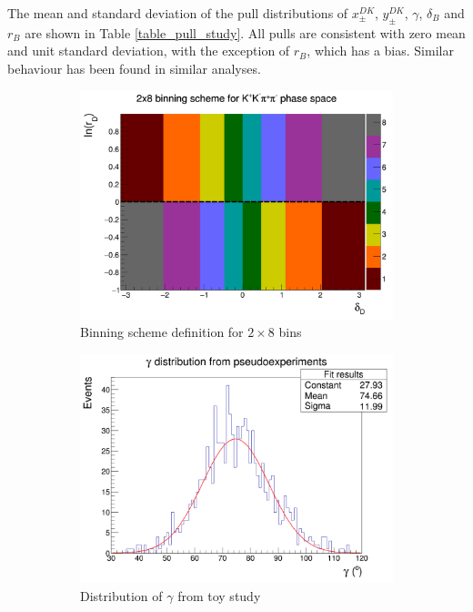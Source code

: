 \documentclass[12pt, a4paper, notitlepage, onecolumn]{article}
\numberwithin{equation}{section}
\begin{document}
The mean and standard deviation of the pull distributions of $x_\pm^{DK}$, $y_\pm^{DK}$, $\gamma$, $\delta_B$ and $r_B$ are shown in Table \ref{table_pull_study}. All pulls are consistent with zero mean and unit standard deviation, with the exception of $r_B$, which has a bias. Similar behaviour has been found in similar analyses.

\begin{figure}[H] 
  \centering
  \begin{subfigure}{0.5\textwidth}
    \centering
    \includegraphics[width=1\textwidth]{Plots/BinningSchemePlot.png}
    \caption{Binning scheme definition for $2\times 8$ bins}
    \label{fig_binning_scheme}
  \end{subfigure}%
  \begin{subfigure}{0.5\textwidth}
    \centering
    \includegraphics[width=1\textwidth]{Plots/GammaDistribution8BinsVariableWidth.png}
    \caption{Distribution of $\gamma$ from toy study}
    \label{fig_gamma_pull_study}
  \end{subfigure}
  \caption{}
\end{figure}
\end{document}
